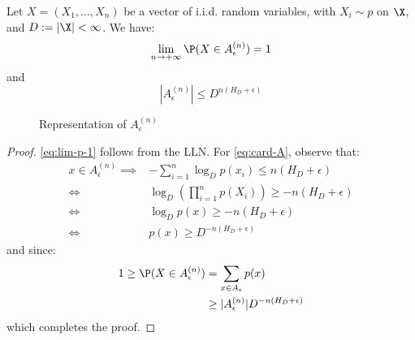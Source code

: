 \documentclass[toc, titlepaged]{../cs-classes/cs-classes}
\begin{document}
\begin{property}
    \label{prop:typ-seq-concentrate}
    Let $X=(X_1, \dots, X_n)$ be a vector of i.i.d. random variables, with $X_i\sim p$ on $\X$, and $D:=|\X|<\infty$. We have:
    \begin{equation}
        \label{eq:lim-p-1}
        \lim_{n\to+\infty}\P(X\in A_\epsilon^{(n)})=1
    \end{equation}
    and
    \begin{equation}
        \label{eq:card-A}
        |A_\epsilon^{(n)}|\leq D^{n(H_D+\epsilon)}
    \end{equation}
    \begin{figure}
        \center
        \caption{Representation of $A_\epsilon^{(n)}$}
    \end{figure}
\end{property}

\begin{proof}
    \eqref{eq:lim-p-1} follows from the LLN. For \eqref{eq:card-A}, observe that:
    \begin{equation*}
        \begin{aligned}
            x\in A_\epsilon^{(n)}\implies& -\sum_{i=1}^n \log_D p(x_i)\leq n(H_D+\epsilon)\\
            \iff&\log_D\left(\prod_{i=1}^n p(X_i)\right)\geq -n(H_D+\epsilon)\\
            \iff&\log_Dp(x)\geq -n(H_D+\epsilon)\\
            \iff&p(x)\geq D^{-n(H_D+\epsilon)}
        \end{aligned}
    \end{equation*}
    and since:
    \begin{equation*}
        \begin{aligned}
            1\geq \P(X\in A_\epsilon^{(n)})&=\sum_{x\in A_\epsilon}p(x)\\
            &\geq |A_\epsilon^{(n)}|D^{-n(H_D+\epsilon)}
        \end{aligned}
    \end{equation*}
    which completes the proof.
\end{proof}
\end{document}
